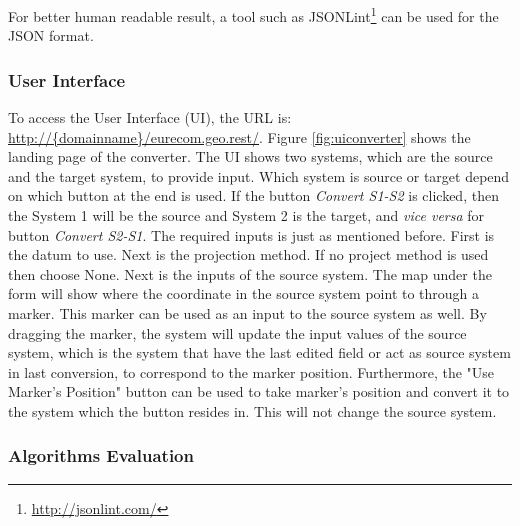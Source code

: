For better human readable result, a tool such as JSONLint\footnote{ \url{http://jsonlint.com/}} can be used for the JSON format.


\subsubsection{User Interface}
To access the User Interface (UI), the URL is: \url{http://{domainname}/eurecom.geo.rest/}. Figure \ref{fig:uiconverter} shows the landing page of the converter. The UI shows two systems, which are the source and the target system, to provide input. Which system is source or target depend on which button at the end is used. If the button \textit{Convert S1-S2} is clicked, then the System 1 will be the source and System 2 is the target, and \textit{vice versa} for button \textit{Convert S2-S1}.
The required inputs is just as mentioned before. First is the datum to use. Next is the projection method. If no project method is used then choose None. Next is the inputs of the source system.
The map under the form will show where the coordinate in the source system point to through a marker. This marker can be used as an input to the source system as well.
By dragging the marker, the system will update the input values of the source system, which is the system that have the last edited field or act as source system in last conversion, to correspond to the marker position. Furthermore, the "Use Marker's Position" button can be used to take marker's position and convert it to the system which the button resides in. This will not change the source system.


\begin{figure}[!htp]
\end{figure}


\subsubsection{Algorithms Evaluation}

